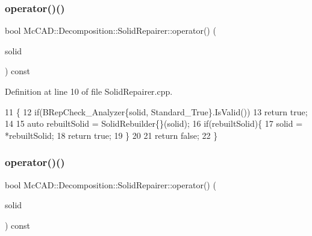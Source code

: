 \subsubsection{\texorpdfstring{operator()()}{operator()()}\hspace{0.1cm}{\footnotesize\ttfamily [1/4]}}
{\footnotesize\ttfamily bool Mc\+C\+A\+D\+::\+Decomposition\+::\+Solid\+Repairer\+::operator() (\begin{DoxyParamCaption}\item[{Topo\+D\+S\+\_\+\+Solid \&}]{solid }\end{DoxyParamCaption}) const}



Definition at line 10 of file Solid\+Repairer.\+cpp.


\begin{DoxyCode}
11                                   \{
12     \textcolor{keywordflow}{if}(BRepCheck\_Analyzer\{solid, Standard\_True\}.IsValid())
13         \textcolor{keywordflow}{return} \textcolor{keyword}{true};
14 
15     \textcolor{keyword}{auto} rebuiltSolid = SolidRebuilder\{\}(solid);
16     \textcolor{keywordflow}{if}(rebuiltSolid)\{
17         solid = *rebuiltSolid;
18         \textcolor{keywordflow}{return} \textcolor{keyword}{true};
19     \}
20 
21     \textcolor{keywordflow}{return} \textcolor{keyword}{false};
22 \}
\end{DoxyCode}
\mbox{\label{classMcCAD_1_1Decomposition_1_1SolidRepairer_a15d9d3012719eff5c3ff33baf7859ad6}} 
\subsubsection{\texorpdfstring{operator()()}{operator()()}\hspace{0.1cm}{\footnotesize\ttfamily [2/4]}}
{\footnotesize\ttfamily bool Mc\+C\+A\+D\+::\+Decomposition\+::\+Solid\+Repairer\+::operator() (\begin{DoxyParamCaption}\item[{Topo\+D\+S\+\_\+\+Solid \&}]{solid }\end{DoxyParamCaption}) const}

\mbox{\label{classMcCAD_1_1Decomposition_1_1SolidRepairer_a3d721f81f2649ad178fc07cbc65dd6bc}} 
